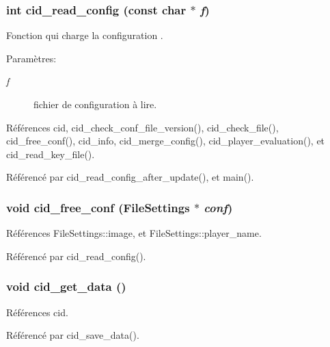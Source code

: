 \subsubsection{\setlength{\rightskip}{0pt plus 5cm}int cid\_\-read\_\-config (const char $\ast$ {\em f})}\label{cid-config_8c_76b2b01d2c1cba520d9183fe1ab756bf}


Fonction qui charge la configuration . \begin{Desc}
\item[Paramètres:]
\begin{description}
\item[{\em f}]fichier de configuration à lire. \end{description}
\end{Desc}


Références cid, cid\_\-check\_\-conf\_\-file\_\-version(), cid\_\-check\_\-file(), cid\_\-free\_\-conf(), cid\_\-info, cid\_\-merge\_\-config(), cid\_\-player\_\-evaluation(), et cid\_\-read\_\-key\_\-file().

Référencé par cid\_\-read\_\-config\_\-after\_\-update(), et main().
\subsubsection{\setlength{\rightskip}{0pt plus 5cm}void cid\_\-free\_\-conf ({\bf FileSettings} $\ast$ {\em conf})}\label{cid-config_8c_2b89918241ccf974ebbc275fcbf938af}




Références FileSettings::image, et FileSettings::player\_\-name.

Référencé par cid\_\-read\_\-config().
\subsubsection{\setlength{\rightskip}{0pt plus 5cm}void cid\_\-get\_\-data ()}\label{cid-config_8c_a237fd95c44a9108b1bc85e22af12d94}




Références cid.

Référencé par cid\_\-save\_\-data().
